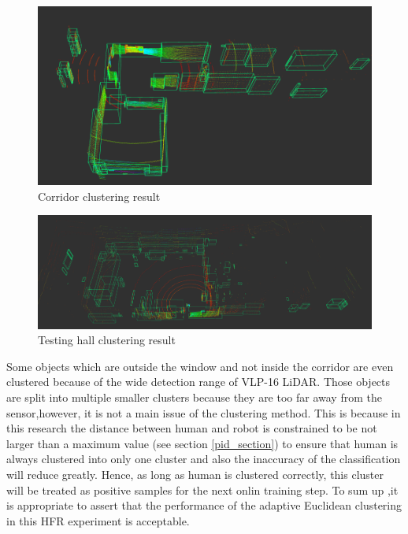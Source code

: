 \begin{figure}[h]
    \centering
    \includegraphics[width=1.0\linewidth]{figures/chap3_fig/euclidean/3_2_7.png}
    \caption{Corridor clustering result}
    \label{Chap3:Fig13}
\end{figure}

\begin{figure}[h]
    \centering
    \includegraphics[width=1.0\linewidth]{figures/chap3_fig/euclidean/3_2_5.png}
    \caption{Testing hall clustering result}
    \label{Chap3:Fig11}
\end{figure}

Some objects which are outside the window and not inside the 
corridor are even clustered because of the wide detection range of VLP-16 LiDAR. Those objects are split into multiple smaller 
clusters because they are too far away from the sensor,however, it is not a main issue of the clustering method. This is because 
in this research the distance between human and robot is constrained to be not larger than a maximum value (see section \ref{pid_section}) to 
ensure that human is always clustered into only one cluster and also the inaccuracy of the classification will reduce greatly. Hence, as long as 
human is clustered correctly, this cluster will be treated as positive samples for the next onlin training step. To sum up ,it is appropriate to assert that 
the performance of the adaptive Euclidean clustering in this HFR experiment is acceptable.


